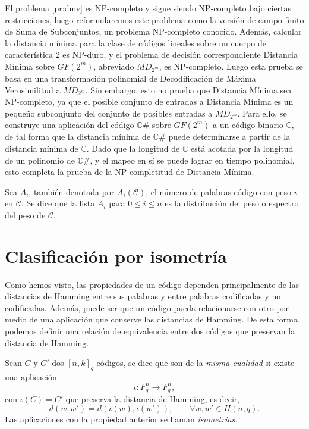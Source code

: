 El problema \ref{pr:dmv} es NP-completo y sigue siendo NP-completo bajo ciertas restricciones, luego reformularemos este problema como la versión de campo finito de Suma de Subconjuntos, un problema NP-completo conocido. Además, calcular la distancia mínima para la clase de códigos lineales sobre un cuerpo de característica 2 es NP-duro, y el problema de decisión correspondiente Distancia Mínima sobre $GF(2^m)$, abreviado $MD_{2^m}$, es NP-completo. Luego esta prueba se basa en una transformación polinomial de Decodificación de Máxima Verosimilitud a $MD_{2^m}$. Sin embargo, esto no prueba que Distancia Mínima sea NP-completo, ya que el posible conjunto de entradas a Distancia Mínima es un pequeño subconjunto del conjunto de posibles entradas a $MD_{2^m}$. Para ello, se construye una aplicación del código $\mathbb{C\#}$ sobre $GF(2^m)$ a un código binario $\mathbb{C}$, de tal forma que la distancia mínima de $\mathbb{C\#}$ puede determinarse a partir de la distancia mínima de $\mathbb{C}$. Dado que la longitud de $\mathbb{C}$ está acotada por la longitud de un polinomio de $\mathbb{C\#}$, y el mapeo en sí se puede lograr en tiempo polinomial, esto completa la prueba de la NP-completitud de Distancia Mínima.


\begin{definition}
    Sea $A_i$, también denotada por $A_i(\mathcal{C})$, el número de palabras código con peso $i$ en $\mathcal{C}$. Se dice que la lista $A_i$ para $0 \leq i \leq n$ es la distribución del peso o espectro del peso de $\mathcal{C}$.
\end{definition}

\section{Clasificación por isometría}

Como hemos visto, las propiedades de un código dependen principalmente de las distancias de Hamming entre sus palabras y entre palabras codificadas y no codificadas. Además, puede ser que un código pueda relacionarse con otro por medio de una aplicación que conserve las distancias de Hamming. De esta forma, podemos definir una relación de equivalencia entre dos códigos que preservan la distancia de Hamming.

Sean $C$ y $C'$ dos $[n,k]_q$ códigos, se dice que son de la \emph{misma cualidad} si existe una aplicación
\[
    \iota : F^n_q \rightarrow F^n_q,
\]
con $\iota(C) = C'$ que preserva la distancia de Hamming, es decir, 
\[
    d(w,w') = d(\iota (w), \iota(w')), \qquad \forall w,w' \in H(n,q).
\]
Las aplicaciones con la propiedad anterior se llaman \emph{isometrías}.


